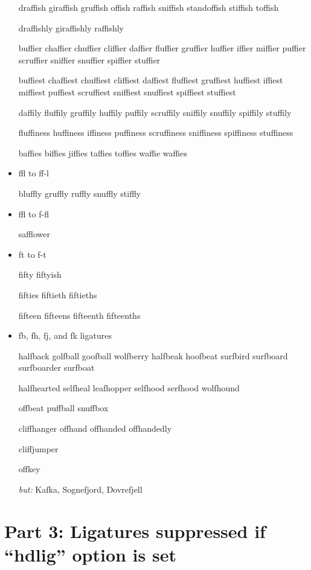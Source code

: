 \begin{itemize}
draffish giraffish gruffish offish raffish sniffish standoffish stiffish toffish

draffishly giraffishly raffishly

buffier chaffier chuffier cliffier daffier fluffier gruffier huffier iffier miffier puffier scruffier sniffier snuffier spiffier stuffier

buffiest chaffiest chuffiest cliffiest daffiest fluffiest gruffiest huffiest iffiest miffiest puffiest scruffiest sniffiest snuffiest spiffiest stuffiest

daffily fluffily gruffily huffily puffily scruffily sniffily snuffily spiffily stuffily

fluffiness huffiness iffiness puffiness scruffiness sniffiness spiffiness stuffiness

baffies biffies jiffies taffies toffies waffie waffies


\item ffl to ff-l

bluffly gruffly ruffly snuffly stiffly


\item ffl to f-fl

safflower


\item ft to f-t

fifty fiftyish

fifties fiftieth fiftieths

fifteen fifteens fifteenth fifteenths

\bgroup \ebg
\item fb, fh, fj, and fk ligatures

halfback golfball goofball wolfberry halfbeak hoofbeat surfbird surfboard surfboarder surfboat

halfhearted selfheal leafhopper selfhood serfhood wolfhound

offbeat puffball snuffbox

cliffhanger offhand offhanded offhandedly

cliffjumper

offkey

\emph{but:} Kafka, Sognefjord, Dovrefjell

\egroup



\end{itemize}


\section*{Part 3: Ligatures suppressed if ``hdlig'' option is set}

